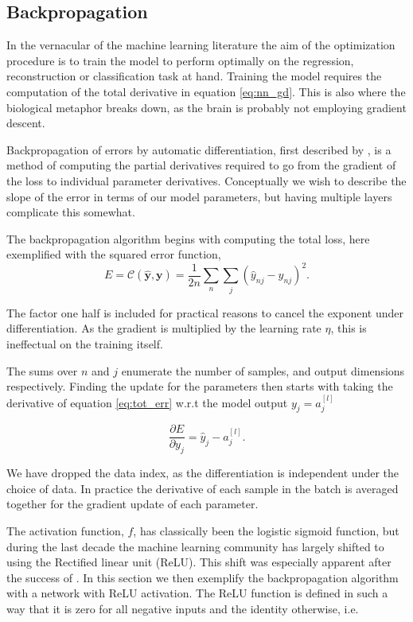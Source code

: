 \subsection{Backpropagation}\label{sec:backpropagation}

In the vernacular of the machine learning literature the aim of the optimization procedure is to train the model to perform optimally on the regression, reconstruction or classification task at hand. Training the model requires the computation of the total derivative in equation \ref{eq:nn_gd}. This is also where the biological metaphor breaks down, as the brain is probably not employing gradient descent.

Backpropagation of errors by automatic differentiation, first described by \citet{Linnainmaa1976}, is a method of computing the partial derivatives required to go from the gradient of the loss to individual parameter derivatives. Conceptually we wish to describe the slope of the error in terms of our model parameters, but having multiple layers complicate this somewhat. 

The backpropagation algorithm begins with computing the total loss, here exemplified with the squared error function,
\begin{equation}\label{eq:tot_err}
	E = \mathcal{C}(\mathbf{\hat{y}}, \mathbf{y}) = \frac{1}{2n}\sum_n \sum_j (\hat{y}_{nj}-y_{nj} )^2.
\end{equation}

\noindent The factor one half is included for practical reasons to cancel the exponent under differentiation. As the gradient is multiplied by the learning rate $\eta$, this is ineffectual on the training itself. 

The sums over $n$ and $j$ enumerate the number of samples, and output dimensions respectively. Finding the update for the parameters then starts with taking the derivative of equation \ref{eq:tot_err} w.r.t the model output $y_j  = a^{[l]}_j$

\begin{equation}\label{eq:err_grad}
	\frac{\partial E}{\partial y_{j}} = \hat{y}_{j} - a^{[l]}_j.
\end{equation}

\noindent We have dropped the data index, as the differentiation is independent under the choice of data. In practice the derivative of each sample in the batch is averaged together for the gradient update of each parameter. 

The activation function, $f$, has classically been the logistic sigmoid function, but during the last decade the machine learning community has largely shifted to using the Rectified linear unit (ReLU). This shift was especially apparent after the success of \citet{Krizhevsky2012}. In this section we then exemplify the backpropagation algorithm with a network with ReLU activation. The ReLU function is defined in such a way that it is zero for all negative inputs and the identity otherwise, i.e. 

